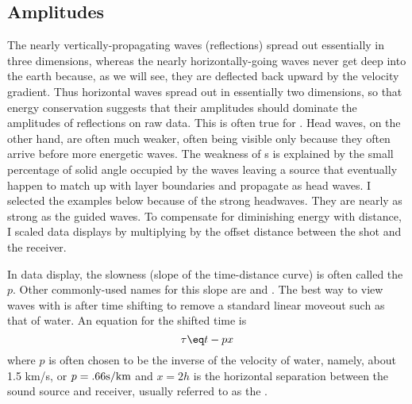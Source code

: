 \subsection{Amplitudes}
\par
The nearly vertically-propagating waves (reflections)
spread out essentially in three dimensions,
whereas the nearly horizontally-going waves
never get deep into the earth because,
as we will see,
they are deflected back upward by the velocity gradient.
Thus horizontal waves spread out in essentially two dimensions, 
so that energy conservation suggests
that their amplitudes should dominate the amplitudes of reflections
on raw data.
This is often true for .
Head waves, on the other hand,
are often much weaker, often being visible only because
they often arrive before more energetic waves.
The weakness of s
is explained by
the small percentage of solid angle occupied by the waves leaving a source
that eventually happen to match up with layer boundaries and propagate as
head waves.
I %
selected the examples below because of the strong headwaves.
They are nearly as strong as the guided waves.
To compensate for diminishing energy with distance,
I scaled data displays by multiplying by the offset distance
between the shot and the receiver.
\par
In data display, the slowness (slope of the time-distance curve)
is often called the   $p$.  Other commonly-used names for
this slope are  and .
The best way to view waves with 
is after time shifting to remove a standard linear moveout
such as that of water.
An equation for the shifted time is
\begin{equation}
\tau \eq t - p x
\label{eqn:lmo}
\end{equation}
where $p$ is often chosen to be the inverse of the velocity of water,
namely, about 1.5 km/s, or $p=.66 {\rm s/km}$
and $x=2h$ is the horizontal separation between
the sound source and receiver, usually referred to as the .

